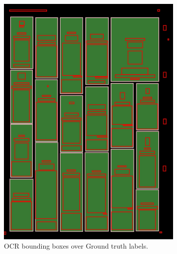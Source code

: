 \documentclass[oneside, english, bibtex]{kththesis}
\begin{document}
\begin{figure}[!htb]
\begin{adjustbox}{center,max size={\textwidth}{0.9\textheight}}
{\begin{subfigure}{0.6\textwidth}
\includegraphics[width=\linewidth]{figures/ocr_bbox/GQU6vjW.jpg}
  \caption{OCR bounding boxes over Ground truth labels.}
  \label{fig:GQU6vjW_GTbb}
\end{subfigure}
\begin{subfigure}{0.6\textwidth}
  \centering

\end{subfigure}}
\end{adjustbox}
\end{figure}
\end{document}
